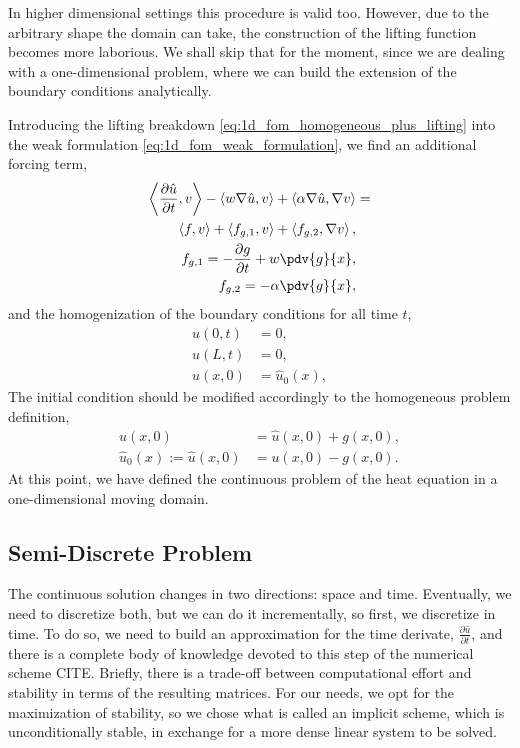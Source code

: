 \documentclass[../../main.tex]{subfiles}
\newcommand{\inner}[2]{\left<#1, #2\right>}
\begin{document}
In higher dimensional settings this procedure is valid too. 
However, due to the arbitrary shape the domain can take, the construction of the lifting function becomes more laborious.
We shall skip that for the moment, since we are dealing with a one-dimensional problem, where we can build the extension of the boundary conditions analytically. 

Introducing the lifting breakdown \eqref{eq:1d_fom_homogeneous_plus_lifting} into the weak formulation \eqref{eq:1d_fom_weak_formulation},
we find an additional forcing term,
\begin{subequations}
    \label{eq:1d_fom_weak_formulation_homogeneous}
    \begin{align}
        \inner{\frac{\partial \hat{u}}{\partial t}}{v} - \inner{w \grad \hat{u}}{v} + \inner{\alpha \grad \hat{u}}{\grad v} &= \nonumber \\  
        \inner{f}{v} + \inner{f_{g,1}}{v} + \inner{f_{g,2}}{\grad v}, \\
        f_{g,1} = - \frac{\partial g}{\partial t} + w \pdv{g}{x}, \\
        f_{g,2} = - \alpha \pdv{g}{x},
    \end{align}
\end{subequations}
and the homogenization of the boundary conditions for all time $t$,
\begin{subequations}
    \begin{align}
        \hat{u}(0, t) &= 0, \\
        \hat{u}(L, t) &= 0, \\
        \hat{u}(x, 0) &= \hat{u}_0(x),
    \end{align}
\end{subequations}
The initial condition should be modified accordingly to the homogeneous problem definition, 
\begin{subequations}
    \begin{align}
    u(x,0) &= \hat{u}(x,0) + g(x,0), \\ 
    \hat{u}_0(x):= \hat{u}(x,0) &= u(x,0) - g(x,0) . 
    \end{align}
\end{subequations}
At this point, we have defined the continuous problem of the heat equation in a one-dimensional moving domain. 

\subsection{Semi-Discrete Problem}
The continuous solution changes in two directions: space and time.
Eventually, we need to discretize both, but we can do it incrementally, so first, we discretize in time. 
To do so, we need to build an approximation for the time derivate, $\frac{\partial \hat{u}}{\partial t}$, and there is a complete body of knowledge devoted to this step of the numerical scheme CITE. 
Briefly, there is a trade-off between computational effort and stability in terms of the resulting matrices.
For our needs, we opt for the maximization of stability, so we chose what is called an implicit scheme, which is unconditionally stable, in exchange for a more dense linear system to be solved. 
\end{document}
